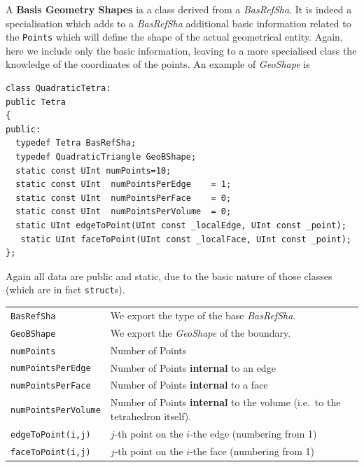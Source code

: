 A \textbf{Basis Geometry Shapes} ia a class derived from a
\emph{BasRefSha}.  It is indeed a specialisation which adds to a
\emph{BasRefSha} additional basic information related to the
\texttt{Points} which will define the shape of the actual geometrical
entity. Again, here we include only the basic information, leaving to
a more specialised class the knowledge of the coordinates of the
points.  An example of \emph{GeoShape} is
\begin{verbatim}
class QuadraticTetra:
public Tetra
{
public:
  typedef Tetra BasRefSha;
  typedef QuadraticTriangle GeoBShape;
  static const UInt numPoints=10;
  static const UInt  numPointsPerEdge    = 1;
  static const UInt  numPointsPerFace    = 0;
  static const UInt  numPointsPerVolume  = 0;
  static UInt edgeToPoint(UInt const _localEdge, UInt const _point);
   static UInt faceToPoint(UInt const _localFace, UInt const _point);
};
\end{verbatim}
Again all data are public and static, due to the basic nature of those
classes (which are in fact \texttt{struct}s).

\begin{tabularx}{\textwidth}{lX}
\hline
\texttt{BasRefSha} & We export the type of the base \emph{BasRefSha}.\\
\texttt{GeoBShape}  & We export the \emph{GeoShape} of the boundary.\\
\texttt{numPoints} & Number of Points\\
\texttt{numPointsPerEdge} & Number of Points \textbf{internal} to an edge\\
\texttt{numPointsPerFace} & Number of Points \textbf{internal} to a face\\
\texttt{numPointsPerVolume} & Number of Points \textbf{internal} to the volume
(i.e.\  to the tetrahedron itself).\\
\texttt{edgeToPoint(i,j)} & $j$-th point on the $i$-the edge (numbering from 1)\\
\texttt{faceToPoint(i,j)} & $j$-th point on the $i$-the face (numbering from 1) \\
\hline
\end{tabularx}

